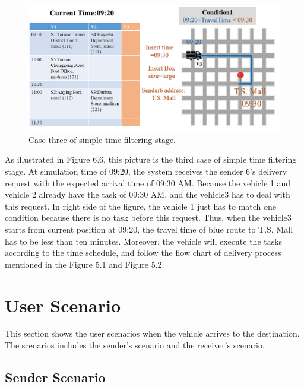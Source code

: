 \documentclass[12pt]{ksthesis}
\begin{document}
\begin{thesis}
{\begin{figure}[H]
\centering
\includegraphics[width=1.14\textwidth]{./Thesis_figures/F6-6_caseThree_SchedulingStage.PNG}
\caption{\large Case three of simple time filtering stage.}
\vspace{0.5cm}
\label{Fig:CaseThree_TimeFiltering}
\end{figure}

As illustrated in Figure 6.6, this picture is the third case of simple time filtering stage. At simulation time of 09:20, the system receives the sender 6’s delivery request with the expected arrival time of 09:30 AM. Because the vehicle 1 and vehicle 2 already have the task of 09:30 AM, and the vehicle3 has to deal with this request. In right side of the figure, the vehicle 1 just has to match one condition because there is no task before this request. Thus, when the vehicle3 starts from current position at 09:20, the travel time of blue route to T.S. Mall has to be less than ten minutes.
Moreover, the vehicle will execute the tasks according to the time schedule, and follow the flow chart of delivery process mentioned in the Figure 5.1 and Figure 5.2.


\section{User Scenario}

This section shows the user scenarios when the vehicle arrives to the destination. The scenarios includes the sender's scenario and the receiver's scenario.

\subsection{Sender Scenario}

}
\end{thesis}
\end{document}
